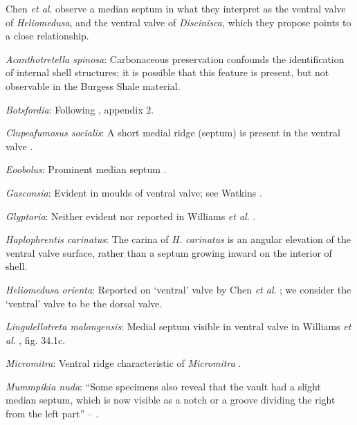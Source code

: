 \documentclass[openany]{book}
\theoremstyle{definition}
\theoremstyle{definition}
\theoremstyle{definition}
\theoremstyle{remark}
\begin{document}
Chen \emph{et al}. \citeyearpar{Chen2007Reinterpretationof} observe a
median septum in what they interpret as the ventral valve of
\emph{Heliomedusa}, and the ventral valve of \emph{Discinisca}, which
they propose points to a close relationship.

\hypertarget{Acanthotretella_spinosa-coding-52}{}
\emph{Acanthotretella spinosa}: Carbonaceous preservation confounds the
identification of internal shell structures; it is possible that this
feature is present, but not observable in the Burgess Shale material.

\hypertarget{Botsfordia-coding-52}{}
\emph{Botsfordia}: Following \citet{Williams1998Thediversity}, appendix
2.

\hypertarget{Clupeafumosus_socialis-coding-52}{}
\emph{Clupeafumosus socialis}: A short medial ridge (septum) is present
in the ventral valve \citep{Topper2013Reappraisalof}.

\hypertarget{Eoobolus-coding-52}{}
\emph{Eoobolus}: Prominent median septum \citep[fig. 4d, e
in][]{Balthasar2009Thebrachiopod}.

\hypertarget{Gasconsia-coding-52}{}
\emph{Gasconsia}: Evident in moulds of ventral valve; see Watkins
\citeyearpar{Watkins2002Newrecord}.

\hypertarget{Glyptoria-coding-52}{}
\emph{Glyptoria}: Neither evident nor reported in Williams \emph{et al}.
\citeyearpar{Williams2000LinguliformeaCraniiformea}.

\hypertarget{Haplophrentis_carinatus-coding-52}{}
\emph{Haplophrentis carinatus}: The carina of \emph{H. carinatus} is an
angular elevation of the ventral valve surface, rather than a septum
growing inward on the interior of shell.

\hypertarget{Heliomedusa_orienta-coding-52}{}
\emph{Heliomedusa orienta}: Reported on `ventral' valve by Chen \emph{et
al}. \citeyearpar{Chen2007Reinterpretationof}; we consider the `ventral'
valve to be the dorsal valve.

\hypertarget{Lingulellotreta_malongensis-coding-52}{}
\emph{Lingulellotreta malongensis}: Medial septum visible in ventral
valve in Williams \emph{et al}.
\citeyearpar{Williams2000LinguliformeaCraniiformea}, fig. 34.1c.

\hypertarget{Micromitra-coding-52}{}
\emph{Micromitra}: Ventral ridge characteristic of \emph{Micromitra}
\citep{Skovsted2010EarlyCambrian}.

\hypertarget{Mummpikia_nuda-coding-52}{}
\emph{Mummpikia nuda}: ``Some specimens also reveal that the vault had a
slight median septum, which is now visible as a notch or a groove
dividing the right from the left part'' --
\citet{Balthasar2008iMummpikia}.
\end{document}
